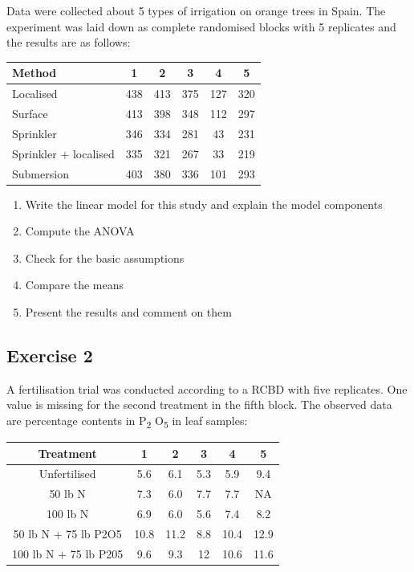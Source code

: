 \documentclass[a4paper,12pt,oneside]{book}
\providecommand{\tightlist}{%
  \setlength{\itemsep}{0pt}\setlength{\parskip}{0pt}}
\begin{document}
Data were collected about 5 types of irrigation on orange trees in Spain. The experiment was laid down as complete randomised blocks with 5 replicates and the results are as follows:

\begin{longtable}[]{@{}lccccc@{}}
\toprule
Method & 1 & 2 & 3 & 4 & 5 \\
\midrule
\endhead
Localised & 438 & 413 & 375 & 127 & 320 \\
Surface & 413 & 398 & 348 & 112 & 297 \\
Sprinkler & 346 & 334 & 281 & 43 & 231 \\
Sprinkler + localised & 335 & 321 & 267 & 33 & 219 \\
Submersion & 403 & 380 & 336 & 101 & 293 \\
\bottomrule
\end{longtable}

\begin{enumerate}
\def\labelenumi{\arabic{enumi}.}
\tightlist
\item
  Write the linear model for this study and explain the model components
\item
  Compute the ANOVA
\item
  Check for the basic assumptions
\item
  Compare the means
\item
  Present the results and comment on them
\end{enumerate}

\hypertarget{exercise-2-5}{%
\subsection{Exercise 2}\label{exercise-2-5}}

A fertilisation trial was conducted according to a RCBD with five replicates. One value is missing for the second treatment in the fifth block. The observed data are percentage contents in P\textsubscript{2} O\textsubscript{5} in leaf samples:

\begin{longtable}[]{@{}cccccc@{}}
\toprule
Treatment & 1 & 2 & 3 & 4 & 5 \\
\midrule
\endhead
Unfertilised & 5.6 & 6.1 & 5.3 & 5.9 & 9.4 \\
50 lb N & 7.3 & 6.0 & 7.7 & 7.7 & NA \\
100 lb N & 6.9 & 6.0 & 5.6 & 7.4 & 8.2 \\
50 lb N + 75 lb P2O5 & 10.8 & 11.2 & 8.8 & 10.4 & 12.9 \\
100 lb N + 75 lb P205 & 9.6 & 9.3 & 12 & 10.6 & 11.6 \\
\bottomrule
\end{longtable}
\end{document}
